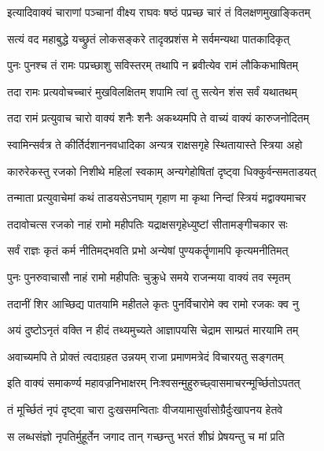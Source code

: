 \twolineshloka
{इत्यादिवाक्यं चाराणां पञ्चानां वीक्ष्य राघवः}
{षष्ठं पप्रच्छ चारं तं विलक्षणमुखाङ्कितम्}%


\twolineshloka
{सत्यं वद महाबुद्धे यच्छ्रुतं लोकसङ्करे}
{तादृक्प्रशंस मे सर्वमन्यथा पातकादिकृत्}%

\twolineshloka
{पुनः पुनश्च तं रामः पप्रच्छाशु सविस्तरम्}
{तथापि न ब्रवीत्येव रामं लौकिकभाषितम्}%

\twolineshloka
{तदा रामः प्रत्यवोचच्चारं मुखविलक्षितम्}
{शपामि त्वां तु सत्येन शंस सर्वं यथातथम्}%

\twolineshloka
{तदा रामं प्रत्युवाच चारो वाक्यं शनैः शनैः}
{अकथ्यमपि ते वाच्यं वाक्यं कारुजनोदितम्}%


\twolineshloka
{स्वामिन्सर्वत्र ते कीर्तिर्दशाननवधादिका}
{अन्यत्र राक्षसगृहे स्थितायास्ते स्त्रिया अहो}%

\twolineshloka
{कारुरेकस्तु रजको निशीथे महिलां स्वकाम्}
{अन्यगेहोषितां दृष्ट्वा धिक्कुर्वन्समताडयत्}%

\twolineshloka
{तन्माता प्रत्युवाचेमां कथं ताडयसेऽनघाम्}
{गृहाण मा कृथा निन्दां स्त्रियं मद्वाक्यमाचर}%

\twolineshloka
{तदावोचत्स रजको नाहं रामो महीपतिः}
{यद्राक्षसगृहेध्युष्टां सीतामङ्गीचकार सः}%

\twolineshloka
{सर्वं राज्ञः कृतं कर्म नीतिमद्भवति प्रभो}
{अन्येषां पुण्यकर्तॄणामपि कृत्यमनीतिमत्}%

\twolineshloka
{पुनः पुनरुवाचासौ नाहं रामो महीपतिः}
{चुक्रुधे समये राजन्मया वाक्यं तव स्मृतम्}%

\twolineshloka
{तदानीं शिर आच्छिद्य पातयामि महीतले}
{कृतः पुनर्विचारोमे क्व रामो रजकः क्व नु}%

\twolineshloka
{अयं दुष्टोऽनृतं वक्ति न हीदं तथ्यमुच्यते}
{आज्ञापयसि चेद्राम साम्प्रतं मारयामि तम्}%

\twolineshloka
{अवाच्यमपि ते प्रोक्तं त्वदाग्रहत उन्नयम्}
{राजा प्रमाणमत्रेदं विचारयतु सङ्गतम्}%


\twolineshloka
{इति वाक्यं समाकर्ण्य महावज्रनिभाक्षरम्}
{निःश्वसन्मुहुरुच्छ्वासमाचरन्मूर्च्छितोऽपतत्}%

\twolineshloka
{तं मूर्च्छितं नृपं दृष्ट्वा चारा दुःखसमन्विताः}
{वीजयामासुर्वासोग्रैर्दुःखापनय हेतवे}%

\twolineshloka
{स लब्धसंज्ञो नृपतिर्मुहूर्तेन जगाद तान्}
{गच्छन्तु भरतं शीघ्रं प्रेषयन्तु च मां प्रति}%

